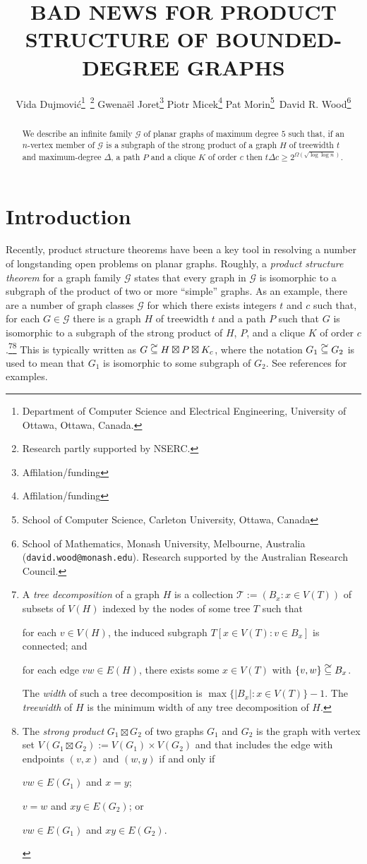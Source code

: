 \documentclass{patmorin}
\title{\MakeUppercase{Bad News for Product Structure of Bounded-Degree Graphs}}
\author{%
  Vida Dujmović\thanks{Department of Computer Science and Electrical Engineering, University of Ottawa, Ottawa, Canada.}\, \thanks{Research partly supported by NSERC.} \quad
  Gwenaël Joret\thanks{Affilation/funding} \quad
  Piotr Micek\thanks{Affilation/funding}\quad
  Pat Morin\thanks{School of Computer Science, Carleton University, Ottawa, Canada}\, \footnotemark[2] \quad
  David R. Wood\thanks{School of Mathematics, Monash University, Melbourne, Australia (\texttt{david.wood@monash.edu}). Research supported by the Australian Research Council.}
}
\date{}
\newcommand{\defin}[1]{\emph{\color{brightmaroon}#1}}
\renewcommand{\ge}{\geqslant}
\newcommand\subsetcong{\mathrel{\text{%
    \setbox0\hbox{$\subseteq$}%
    \rlap{\hbox to \wd0{\hss\hss\hss\raisebox{1.5\height}{$\sim$}\hss}}\box0
}}}
\begin{document}
\maketitle
\renewcommand{\E}{\mathbb{E}}
\renewcommand{\Pr}{\mathbb{P}}


\begin{abstract}
  We describe an infinite family $\mathcal{G}$ of planar graphs of maximum degree $5$ such that, if an $n$-vertex member of $\mathcal{G}$ is a subgraph of the strong product of a graph $H$ of treewidth $t$ and maximum-degree $\Delta$, a path $P$ and a clique $K$ of order $c$ then $t\Delta c \ge 2^{\Omega(\sqrt{\log\log n})}$.
\end{abstract}

\section{Introduction}

Recently, product structure theorems have been a key tool in resolving a number of longstanding open problems on planar graphs.  Roughly, a \defin{product structure theorem} for a graph family $\mathcal{G}$ states that every graph in $\mathcal{G}$ is isomorphic to a subgraph of the product of two or more ``simple'' graphs.  As an example, there are a number of graph classes $\mathcal{G}$ for which there exists integers $t$ and $c$ such that, for each $G\in\mathcal{G}$ there is a graph $H$ of treewidth $t$ and a path $P$ such that $G$ is isomorphic to a subgraph of the strong product of $H$, $P$, and a clique $K$ of order $c$.\footnote{A \defin{tree decomposition} of a graph $H$ is a collection $\mathcal{T}:=(B_x:x\in V(T))$ of subsets of $V(H)$ indexed by the nodes of some tree $T$ such that
\begin{inparaenum}[(i)]
  \item for each $v\in V(H)$, the induced subgraph $T[x\in V(T):v\in B_x]$ is connected; and
  \item for each edge $vw\in E(H)$, there exists some $x\in V(T)$ with $\{v,w\}\subsetcong B_x$.
\end{inparaenum}
The \defin{width} of such a tree decomposition is $\max\{|B_x|:x\in V(T)\}-1$. The \defin{treewidth} of $H$ is the minimum width of any tree decomposition of $H$.}\footnote{The \defin{strong product} $G_1\boxtimes G_2$ of two graphs $G_1$ and $G_2$ is the graph with vertex set $V(G_1\boxtimes G_2):=V(G_1)\times V(G_2)$ and that includes the edge with endpoints $(v,x)$ and $(w,y)$ if and only if
\begin{inparaenum}[(i)]
  \item $vw\in E(G_1)$ and $x=y$;
  \item $v=w$ and $xy\in E(G_2)$; or
  \item $vw\in E(G_1)$ and $xy\in E(G_2)$.
\end{inparaenum}
}
This is typically written as $G\subsetcong H\boxtimes P\boxtimes K_c$, where the notation $G_1\subsetcong G_2$ is used to mean that $G_1$ is isomorphic to some subgraph of $G_2$.  See references \cite{dujmovic.joret.ea:planar,dujmovic.morin.ea:structure,krauthgamer.lee:intrinsic,ueckerdt.wood.ea:improved,bose.morin.ea:optimal,campbell.clinch.ea:product,illingworth.scott.ea:alon} for examples.
\end{document}
